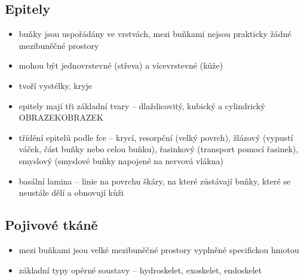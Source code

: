 \documentclass{article}
\begin{document}
\subsection{Epitely}
\begin{itemize}
  \item buňky jsou uspořádány ve vrstvách, mezi buňkami nejsou prakticky žádné mezibuněčné prostory
  \item mohou být jednovrstevné (střeva) a vícevrstevné (kůže)
  \item tvoří vystélky, kryje
  \item epitely mají tři základní tvary -- dlaždicovitý, kubický a cylindrický OBRAZEKOBRAZEK
  \item třídění epitelů podle fce -- krycí, resorpční (velký povrch), žlázový (vypustí váček, část buňky nebo celou buňku), řasinkový (transport pomocí řasinek), smyslový (smyslové buňky napojené na nervová vlákna)
  \item basální lamina -- linie na povrchu škáry, na které zůstávají buňky, které se neustále dělí a obnovují kůži
\end{itemize}

\subsection{Pojivové tkáně}
\begin{itemize}
  \item mezi buňkami jsou velké mezibuněčné prostory vyplněné specifickou hmotou
  \item základní typy opěrné soustavy -- hydroskelet, exoskelet, endoskelet
\end{itemize}
\end{document}
